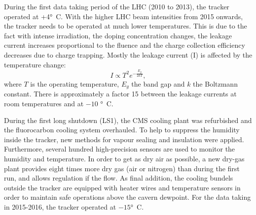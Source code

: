 {  
   During the first data taking period of the LHC (2010 to 2013), the tracker operated at +4\si{ \degree C}. With the higher LHC beam intensities from 2015 onwards, the tracker needs to be operated at much lower temperatures. This is due to the fact with intense irradiation, the doping concentration changes, the leakage current increases proportional to the fluence and the charge collection efficiency decreases due to charge trapping. Mostly the leakage current (I) is affected by the temperature change: 
   \begin{equation}
   I \propto T^2 e^{-\frac{E_g}{2kT}}, 
   \end{equation}
    where $T$ is the operating temperature, $E_g$ the band gap and $k$ the Boltzmann constant. There is approximately a factor 15 between the leakage currents at room temperatures and at $-10$ \si{ \degree C}. 
    
    During the first long shutdown (LS1), the CMS cooling plant was refurbished\cite{running:1998606} and the fluorocarbon cooling system overhauled. To help to suppress the humidity inside the tracker, new methods for vapour sealing and insulation were applied. Furthermore, several hundred high-precision sensors are used to monitor the humidity and temperature. In order to get as dry air as possible, a new dry-gas plant provides eight times more dry gas (air or nitrogen) than during the first run, and allows regulation if the flow. As final addition, the cooling bundels outside the tracker are equipped with heater wires and temperature sensors in order to maintain safe operations above the cavern dewpoint. For the data taking in 2015-2016, the tracker operated at $-15$\si{ \degree C}.
    
}
